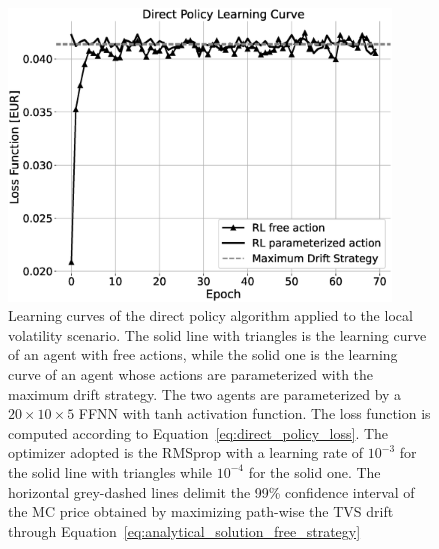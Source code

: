 \documentclass[runningheads]{m2ef}
\newcommand{\change}[1]{{\color{red} {#1}}}%
\begin{document}
\begin{figure}[h!]
	\centering
	\includegraphics[width=4in]{LV_direct_policy_approach_grey.eps}
	\caption{Learning curves of the direct policy algorithm applied to the local volatility \change{scenario}. The solid line with triangles is the learning curve of an agent with free actions, while the solid one is the learning curve of an agent whose actions are parameterized with the maximum drift strategy. The two agents are parameterized by a $20 \times 10 \times 5$ FFNN with tanh activation function. The loss function is computed according to Equation~\eqref{eq:direct_policy_loss}. The optimizer adopted is the RMSprop with a learning rate of $10^{-3}$ for the solid line with triangles while $10^{-4}$ for the solid one. The horizontal grey-dashed lines delimit the 99\% confidence interval of the MC price obtained by maximizing path-wise the TVS drift through Equation~\eqref{eq:analytical_solution_free_strategy}}
	\label{fig:result_lv_direct_policy}
\end{figure}  
\end{document}
